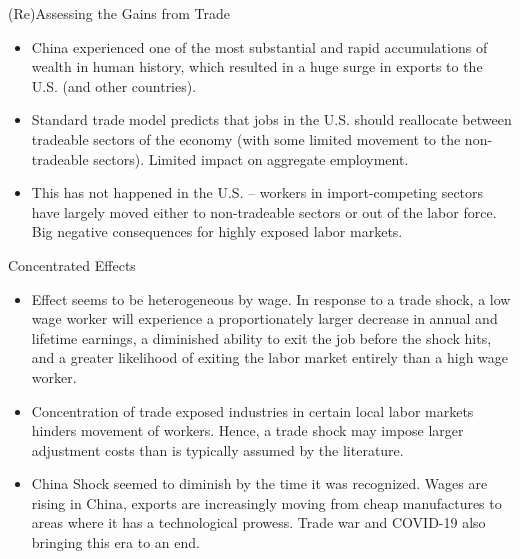 \documentclass[aspectratio=169]{beamer}
\begin{document}
\begin{frame}{(Re)Assessing the Gains from Trade}

\begin{itemize}
    \item<1-> China experienced one of the most substantial and rapid accumulations of wealth in human history, which resulted in a huge surge in exports to the U.S. (and other countries).
    \item<2-> Standard trade model predicts that jobs in the U.S. should reallocate between tradeable sectors of the economy (with some limited movement to the non-tradeable sectors).  Limited impact on aggregate employment.
    \item<3-> This has not happened in the U.S. – workers in import-competing sectors have largely moved either to non-tradeable sectors or out of the labor force.  Big negative consequences for highly exposed labor markets.
\end{itemize}
    
\end{frame}


\begin{frame}{Concentrated Effects}

\begin{itemize}
    \item<1-> Effect seems to be heterogeneous by wage.  In response to a trade shock, a low wage worker will experience a proportionately larger decrease in annual and lifetime earnings, a diminished ability to exit the job before the shock hits, and a greater likelihood of exiting the labor market entirely than a high wage worker.
    \item<2-> Concentration of trade exposed industries in certain local labor markets hinders movement of workers.  Hence, a trade shock may impose larger adjustment costs than is typically assumed by the literature.
    \item<3-> China Shock seemed to diminish by the time it was recognized.  Wages are rising in China, exports are increasingly moving from cheap manufactures to areas where it has a technological prowess.  Trade war and COVID-19 also bringing this era to an end.
\end{itemize}
    
\end{frame}

\end{document}
